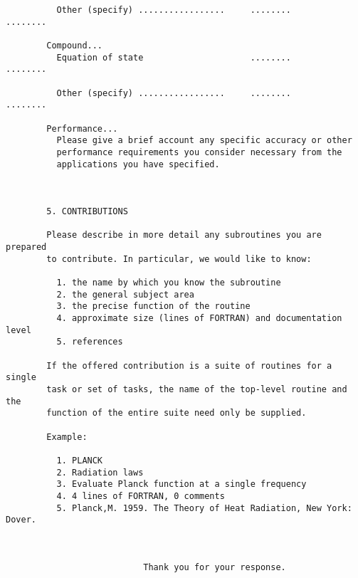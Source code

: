 \begin{verbatim}
          Other (specify) .................     ........        ........

        Compound...
          Equation of state                     ........        ........

          Other (specify) .................     ........        ........

        Performance...
          Please give a brief account any specific accuracy or other
          performance requirements you consider necessary from the
          applications you have specified.



        5. CONTRIBUTIONS

        Please describe in more detail any subroutines you are prepared
        to contribute. In particular, we would like to know:

          1. the name by which you know the subroutine
          2. the general subject area
          3. the precise function of the routine
          4. approximate size (lines of FORTRAN) and documentation level
          5. references

        If the offered contribution is a suite of routines for a single
        task or set of tasks, the name of the top-level routine and the
        function of the entire suite need only be supplied.

        Example:

          1. PLANCK
          2. Radiation laws
          3. Evaluate Planck function at a single frequency
          4. 4 lines of FORTRAN, 0 comments
          5. Planck,M. 1959. The Theory of Heat Radiation, New York: Dover.



                           Thank you for your response.
\end{verbatim}

